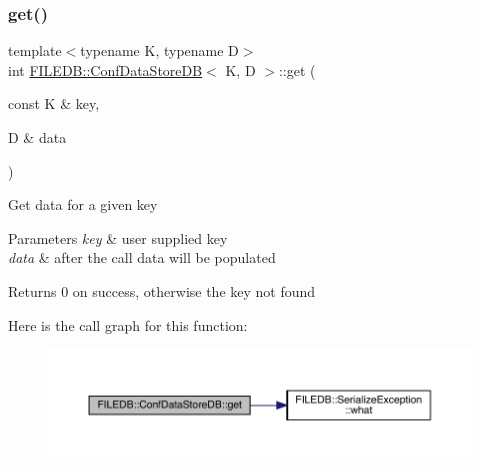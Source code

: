 \subsubsection{\texorpdfstring{get()}{get()}\hspace{0.1cm}{\footnotesize\ttfamily [3/3]}}
{\footnotesize\ttfamily template$<$typename K, typename D$>$ \\
int \mbox{\hyperlink{classFILEDB_1_1ConfDataStoreDB}{F\+I\+L\+E\+D\+B\+::\+Conf\+Data\+Store\+DB}}$<$ K, D $>$\+::get (\begin{DoxyParamCaption}\item[{const K \&}]{key,  }\item[{D \&}]{data }\end{DoxyParamCaption})\hspace{0.3cm}{\ttfamily [inline]}}

Get data for a given key 
\begin{DoxyParams}{Parameters}
{\em key} & user supplied key \\
\hline
{\em data} & after the call data will be populated \\
\hline
\end{DoxyParams}
\begin{DoxyReturn}{Returns}
0 on success, otherwise the key not found 
\end{DoxyReturn}
Here is the call graph for this function\+:
\nopagebreak
\begin{figure}[H]
\begin{center}
\leavevmode
\includegraphics[width=350pt]{d8/d19/classFILEDB_1_1ConfDataStoreDB_ad89d0c1aef7c82fb0273d50bfea7cf0a_cgraph}
\end{center}
\end{figure}
\mbox{\label{classFILEDB_1_1ConfDataStoreDB_a971e372585c497dad3b1bc589bc4dd15}} 
